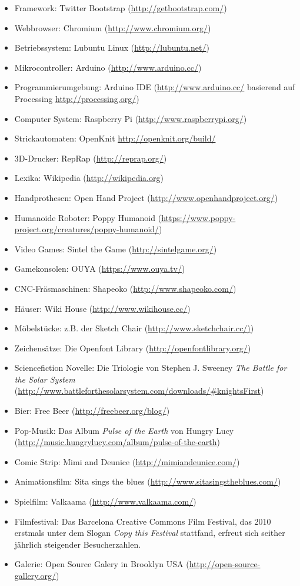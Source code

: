 \documentclass[
paper=164mm:234mm, %
pagesize, %
DIV=calc, %
10pt, %
BCOR=0mm, %
parskip=half- %
]{scrbook}
\begin{document}
\begin{itemize}
	\item Framework: Twitter Bootstrap (\url{http://getbootstrap.com/})
	\item Webbrowser: Chromium (\url{http://www.chromium.org/})
	\item Betriebssystem: Lubuntu Linux (\url{http://lubuntu.net/})
	\item Mikrocontroller: Arduino (\url{http://www.arduino.cc/})
	\item Programmierumgebung: Arduino IDE (\url{http://www.arduino.cc/} basierend auf Processing \url{http://processing.org/})
	\item Computer System: Raspberry Pi (\url{http://www.raspberrypi.org/})
	\item Strickautomaten: OpenKnit \url{http://openknit.org/build/}
	\item 3D-Drucker: RepRap (\url{http://reprap.org/})
	\item Lexika: Wikipedia (\url{http://wikipedia.org})
	\item Handprothesen: Open Hand Project (\url{http://www.openhandproject.org/})
	\item Humanoide Roboter: Poppy Humanoid (\url{https://www.poppy-project.org/creatures/poppy-humanoid/})
	\item Video Games: Sintel the Game (\url{http://sintelgame.org/})
	\item Gamekonsolen: OUYA (\url{https://www.ouya.tv/})
	\item CNC-Fräsmaschinen: Shapeoko (\url{http://www.shapeoko.com/})
	\item Häuser: Wiki House (\url{http://www.wikihouse.cc/})
	\item Möbelstücke: z.B. der Sketch Chair (\url{http://www.sketchchair.cc/)})
	\item Zeichensätze: Die Openfont Library  (\url{http://openfontlibrary.org/})
	\item Sciencefiction Novelle: Die Triologie von Stephen J. Sweeney \emph{The Battle for the Solar System} (\url{http://www.battleforthesolarsystem.com/downloads/#knightsFirst})
	\item Bier: Free Beer (\url{http://freebeer.org/blog/})
	\item Pop-Musik: Das Album \emph{Pulse of the Earth} von Hungry Lucy (\url{http://music.hungrylucy.com/album/pulse-of-the-earth})
	\item Comic Strip: Mimi and Deunice (\url{http://mimiandeunice.com/})
	\item Animationsfilm: Sita sings the blues (\url{http://www.sitasingstheblues.com/})
	\item Spielfilm: Valkaama (\url{http://www.valkaama.com/})
	\item Filmfestival: Das Barcelona Creative Commons Film Festival, das 2010 erstmals unter dem Slogan \emph{Copy this Festival} stattfand, erfreut sich seither jährlich steigender Besucherzahlen.
	\item Galerie: Open Source Galery in Brooklyn USA (\url{http://open-source-gallery.org/})
\end{itemize}
\end{document}
